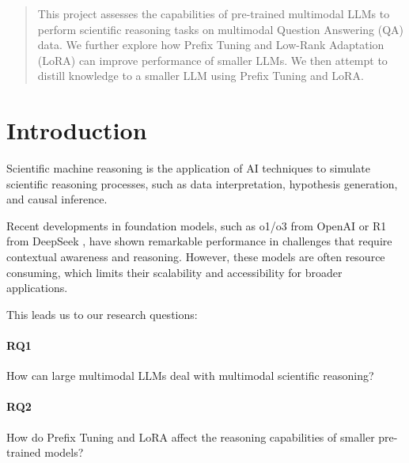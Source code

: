 \documentclass{article}
\begin{document}
\begin{abstract}
This project assesses the capabilities of pre-trained multimodal LLMs to perform scientific reasoning tasks on multimodal Question Answering (QA) data. We further explore how Prefix Tuning and Low-Rank Adaptation (LoRA) can improve performance of smaller LLMs. We then attempt to distill knowledge to a smaller LLM using Prefix Tuning and LoRA.
\end{abstract}
           


\section{Introduction}
\label{introduction}

Scientific machine reasoning is the application of AI techniques to simulate scientific reasoning processes, such as data interpretation, hypothesis generation, and causal inference. 

Recent developments in foundation models, such as o1/o3 from OpenAI \cite{OpenAI2024o1} or R1 from DeepSeek \cite{deepseek-r1}, have shown remarkable performance in challenges that require contextual awareness and reasoning.
However, these models are often resource consuming, which limits their scalability and accessibility for broader applications.

This leads us to our research questions:

\paragraph{RQ1}
\label{def:rq1}
How can large multimodal LLMs deal with multimodal scientific reasoning?

\paragraph{RQ2}
\label{def:rq2}
How do Prefix Tuning and LoRA affect the reasoning capabilities of smaller pre-trained models?
\end{document}
